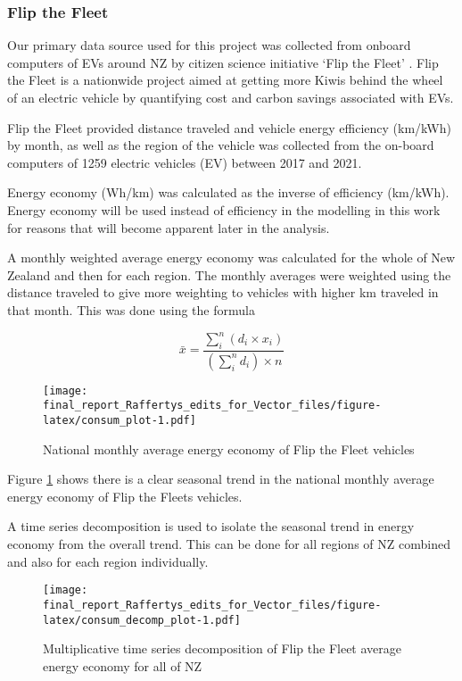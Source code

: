 \documentclass[
]{article}
\begin{document}
\hypertarget{flip-the-fleet}{%
\subsubsection{Flip the Fleet}\label{flip-the-fleet}}

Our primary data source used for this project was collected from onboard
computers of EVs around NZ by citizen science initiative `Flip the
Fleet' \cite{ftf}. Flip the Fleet is a nationwide project aimed at
getting more Kiwis behind the wheel of an electric vehicle by
quantifying cost and carbon savings associated with EVs.

Flip the Fleet provided distance traveled and vehicle energy efficiency
(km/kWh) by month, as well as the region of the vehicle was collected
from the on-board computers of 1259 electric vehicles (EV) between 2017
and 2021.

Energy economy (Wh/km) was calculated as the inverse of efficiency
(km/kWh). Energy economy will be used instead of efficiency in the
modelling in this work for reasons that will become apparent later in
the analysis.

A monthly weighted average energy economy was calculated for the whole
of New Zealand and then for each region. The monthly averages were
weighted using the distance traveled to give more weighting to vehicles
with higher km traveled in that month. This was done using the formula

\[\bar{x} = \frac{\sum_{i}^{n} (d_i\times x_i)}{\left(\sum_{i}^{n} d_i\right)\times n}\]

\begin{figure}
\centering
\texttt{[image: final\_report\_Raffertys\_edits\_for\_Vector\_files/figure-latex/consum\_plot-1.pdf]}
\caption{National monthly average energy economy of Flip the Fleet
vehicles\label{fig:consum_plot}}
\end{figure}

Figure \ref{fig:consum_plot} shows there is a clear seasonal trend in
the national monthly average energy economy of Flip the Fleets vehicles.

A time series decomposition is used to isolate the seasonal trend in
energy economy from the overall trend. This can be done for all regions
of NZ combined and also for each region individually.

\begin{figure}
\centering
\texttt{[image: final\_report\_Raffertys\_edits\_for\_Vector\_files/figure-latex/consum\_decomp\_plot-1.pdf]}
\caption{Multiplicative time series decomposition of Flip the Fleet
average energy economy for all of NZ\label{fig:consum_decomp_plot}}
\end{figure}
\end{document}

